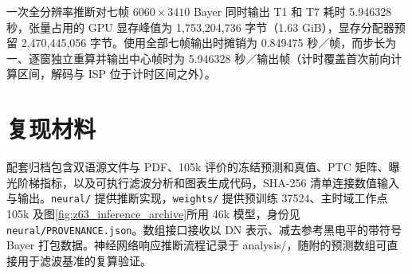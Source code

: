 一次全分辨率推断对七帧 $6060\times3410$ Bayer 同时输出 T1 和 T7 耗时 5.946328 秒，张量占用的 GPU 显存峰值为 1,753,204,736 字节（1.63 GiB），显存分配器预留 2,470,445,056 字节。使用全部七帧输出时摊销为 0.849475 秒／帧，而步长为一、逐窗独立重算并输出中心帧时为 5.946328 秒／输出帧（计时覆盖首次前向计算区间，解码与 ISP 位于计时区间之外）。

\section{复现材料}
配套归档包含双语源文件与 PDF、105k 评价的冻结预测和真值、PTC 矩阵、曝光阶梯指标，以及可执行滤波分析和图表生成代码，SHA-256 清单连接数值输入与输出。\texttt{neural/} 提供推断实现，\texttt{weights/} 提供预训练 37524、主时域工作点 105k 及图\ref{fig:z63_inference_archive}所用 46k 模型，身份见 \texttt{neural/PROVENANCE.json}。数组接口接收以 DN 表示、减去参考黑电平的带符号 Bayer 打包数据。神经网络响应推断流程记录于 analysis/，随附的预测数组可直接用于滤波基准的复算验证。
